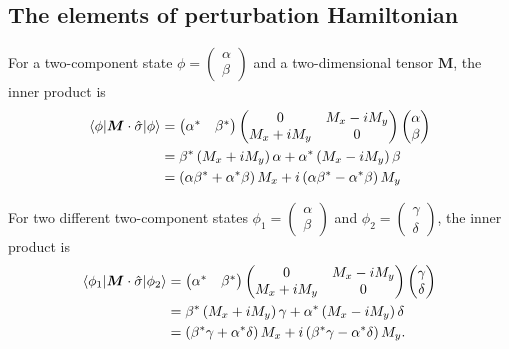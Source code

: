 \documentclass[10pt, oneside]{article}
\newcommand{\p}[1]{\left(#1\right)}
\begin{document}
\subsection{The elements of perturbation Hamiltonian }
For a two-component state \(\phi = \begin{pmatrix}
	\alpha \\ \beta
\end{pmatrix}\) and a two-dimensional tensor \(\bm{M}\), the inner product is 
\begin{align}
	\begin{split}
		\braket{\phi | \bm{M} \cdot \hat{\sigma} | \phi} & = \begin{pmatrix}
			\alpha^{*} & \beta^{*}
		\end{pmatrix} \begin{pmatrix}
			0 & M_{x} - i M_{y} \\
			M_{x} + i M_{y} & 0
		\end{pmatrix} \begin{pmatrix}
			\alpha \\ \beta
		\end{pmatrix} \\
		& =  \beta^{*} \p{M_{x} + i M_{y}} \alpha + \alpha^{*} \p{M_{x} - i M_{y}} \beta  \\
		& = \p{\alpha \beta^{*} + \alpha^{*} \beta } M_{x} + i \p{\alpha \beta^{*}  - \alpha^{*} \beta } M_{y} \\
	\end{split}
\end{align}

For two different two-component states \(\phi_{1} = \begin{pmatrix}
	\alpha \\ \beta
\end{pmatrix}\) and \(\phi_{2} = \begin{pmatrix}
	\gamma \\ \delta
\end{pmatrix}\), the inner product is
\begin{align}
	\begin{split}
		\braket{\phi_1 | \bm{M} \cdot \hat{\sigma} | \phi_{2}} & = \begin{pmatrix}
			\alpha^{*} & \beta^{*}	
		\end{pmatrix} \begin{pmatrix}
			0 & M_{x} - i M_{y} \\	
			M_{x} + i M_{y} & 0
		\end{pmatrix} \begin{pmatrix}
			\gamma \\ \delta
		\end{pmatrix} \\	
		& = \beta^{*} \p{M_{x} + i M_{y}} \gamma + \alpha^{*} \p{M_{x} - i M_{y}} \delta \\
		& = \p{\beta^{*} \gamma + \alpha^{*} \delta} M_{x} + i \p{\beta^{*} \gamma - \alpha^{*} \delta} M_{y}.
	\end{split}
\end{align}
\end{document}
